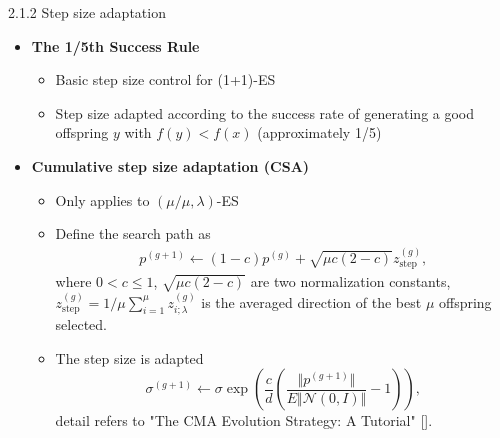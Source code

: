 \documentclass{beamer}
\begin{document}
\begin{frame}{2.1.2 Step size adaptation}
\begin{itemize}
    \item \textbf{The 1/5th Success Rule} 
    \begin{itemize}
        \item Basic step size control for (1+1)-ES 
        \item Step size adapted according to the success rate  of generating a good offspring $y$ with $f(y)<f(x)$ (approximately 1/5)
    \end{itemize}

    \item \textbf{Cumulative step size adaptation (CSA)}
    \begin{itemize}
        \item Only applies to $(\mu/\mu,\lambda)$-ES
        \item Define the search path as 
        \begin{align}
        p^{(g+1)} \leftarrow (1-c)p^{(g)} + \sqrt{\mu c (2-c)} z_{\text{step}}^{(g)},\nonumber 
        \end{align}
        where $0<c \leq 1$, $ \sqrt{\mu c (2-c)}$ are two normalization constants, $z_{\text{step}}^{(g)} = 
        1/\mu \sum_{i=1}^\mu z_{i;\lambda}^{(g)}$ is the averaged direction of the best $\mu$ offspring selected.
        \item The step size is adapted 
            $$\sigma^{(g+1)} \leftarrow \sigma \exp \left (  \frac{c}{d}  \left( \frac{\Vert p^{(g+1)}\Vert}{E \Vert \mathcal{N}(0,I)\Vert } -1 \right) \right ),$$
            detail refers to "The CMA Evolution Strategy: A Tutorial" []. 
    \end{itemize}

\end{itemize}
\end{frame}
\end{document}
